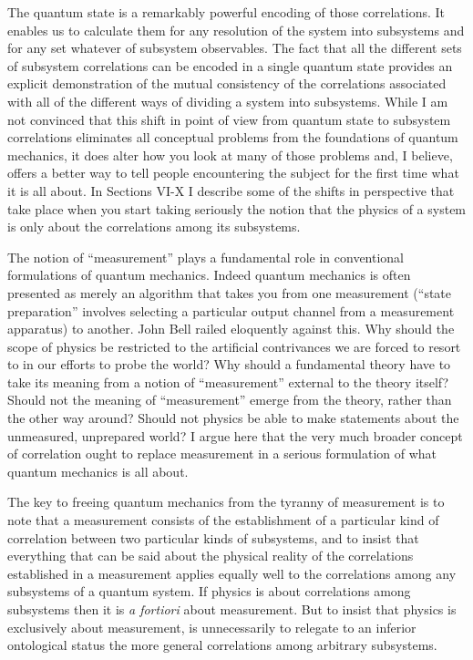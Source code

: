 The quantum state is a remarkably powerful encoding of those
correlations.  It enables us to calculate them for any resolution of
the system into subsystems and for any set whatever of subsystem
observables.  The fact that all the different sets of subsystem
correlations can be encoded in a single quantum state provides an
explicit demonstration of the mutual consistency of the correlations
associated with all of the different ways of dividing a system into
subsystems.  While I am not convinced that this shift in point of view
from quantum state to subsystem correlations eliminates all conceptual
problems from the foundations of quantum mechanics, it does alter how
you look at many of those problems and, I believe, offers a better way
to tell people encountering the subject for the first time what it is
all about.  In Sections VI-X I describe some of the shifts in
perspective that take place when you start taking seriously the notion
that the physics of a system is only about the correlations among its
subsystems.

\bigskip {}\nobreak\medskip\nobreak The notion of ``measurement''
plays a fundamental role in conventional formulations of quantum
mechanics.  Indeed quantum mechanics is often presented as merely an
algorithm that takes you from one measurement (``state preparation''
involves selecting a particular output channel from a measurement
apparatus) to another.  John Bell railed eloquently against this.\fn
Why should the scope of physics be restricted to the artificial
contrivances we are forced to resort to in our efforts to probe the
world?  Why should a fundamental theory have to take its meaning from
a notion of ``measurement'' external to the theory itself?  Should not
the meaning of ``measurement'' emerge from the theory, rather than the
other way around?  Should not physics be able to make statements about
the unmeasured, unprepared world?    \ni I argue here that the
very much broader concept of correlation ought to replace measurement
in a serious formulation of what quantum mechanics is all about.\fn

The key to freeing quantum mechanics from the tyranny of measurement
is to note that a measurement consists of the
establishment of a particular kind of correlation between two
particular kinds of subsystems, and to insist that everything
that can be said about the physical reality of the correlations
established in a measurement applies equally well to the correlations
among any subsystems of a quantum system.  If physics is about
correlations among subsystems then it is {\it a fortiori\/} about
measurement.  But to insist that physics is exclusively about
measurement, is unnecessarily to relegate to an inferior ontological
status the more general correlations among arbitrary subsystems.

